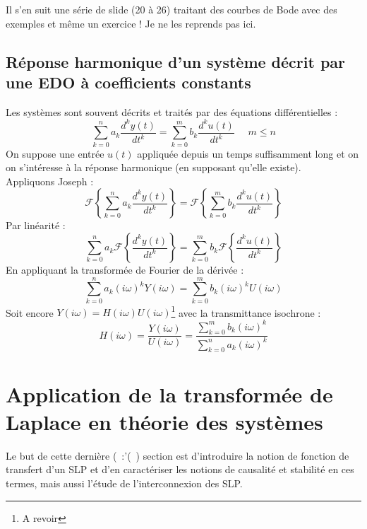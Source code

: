 	Il s'en suit une série de slide (20 à 26) traitant des courbes de Bode avec des exemples 
	et même un exercice ! Je ne les reprends pas ici.






	\subsection{Réponse harmonique d'un système décrit par une EDO à coefficients constants}
	Les systèmes sont souvent décrits et traités par des équations différentielles :
	\begin{equation}
	\sum_{k=0}^n a_k\dfrac{d^ky(t)}{dt^k} = \sum_{k=0}^m b_k\dfrac{d^ku(t)}{dt^k}\ \ \ \ \ \
	m\leq n
	\end{equation}
	On suppose une entrée $u(t)$ appliquée depuis un temps suffisamment long et on on s'intéresse
	à la réponse harmonique (en supposant qu'elle existe).\\
	Appliquons Joseph :
	\begin{equation}
	\mathcal{F}\left\{\sum_{k=0}^n a_k\dfrac{d^ky(t)}{dt^k}\right\} =	\mathcal{F}\left\{
	\sum_{k=0}^m b_k\dfrac{d^ku(t)}{dt^k}\right\}
	\end{equation}
	Par linéarité :
	\begin{equation}
	\sum_{k=0}^n a_k\mathcal{F}\left\{\dfrac{d^ky(t)}{dt^k}\right\} =	\sum_{k=0}^m b_k
	\mathcal{F}\left\{\dfrac{d^ku(t)}{dt^k}\right\}
	\end{equation}
	En appliquant la transformée de Fourier de la dérivée :
	\begin{equation}
	\sum_{k=0}^n a_k(i\omega)^kY(i\omega) = \sum_{k=0}^m b_k(i\omega)^kU(i\omega)
	\end{equation}
	Soit encore $Y(i\omega) = H(i\omega)U(i\omega)$\footnote{A revoir} avec la transmittance 
	isochrone :
	\begin{equation}
	H(i\omega) = \dfrac{Y(i\omega)}{U(i\omega)} = \dfrac{\sum_{k=0}^m b_k(i\omega)^k
	}{\sum_{k=0}^n a_k(i\omega)^k}
	\end{equation}




\section{Application de la transformée de Laplace en théorie des systèmes}
Le but de cette dernière (\ :'(\ ) section est d'introduire la notion de fonction de 
transfert d'un SLP et d'en caractériser les notions de causalité et stabilité en ces
termes, mais aussi l'étude de l'interconnexion des SLP.

